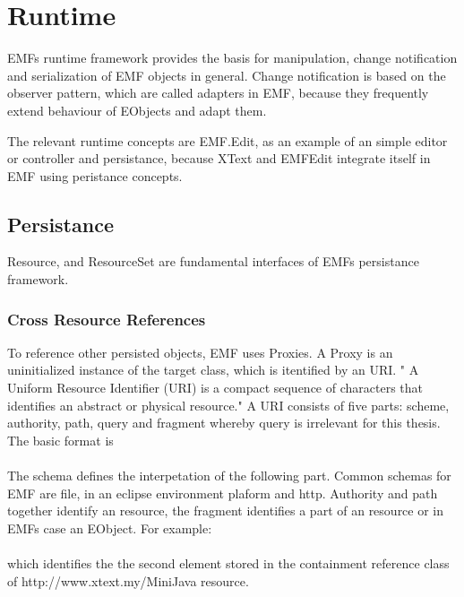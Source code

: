 \section{Runtime}
EMFs runtime framework provides the basis for manipulation, change notification and serialization of EMF objects in general. \cite{EMF2nd} Change notification is based on the observer pattern, which are called adapters in EMF, because they frequently extend behaviour of EObjects and adapt them.

The relevant runtime concepts are EMF.Edit, as an example of an simple editor or controller and  persistance, because XText \cite{XTextMan} and EMFEdit integrate itself in EMF using peristance concepts.

\subsection{Persistance}
Resource, and ResourceSet are fundamental interfaces of EMFs persistance framework.


\subsubsection{Cross Resource References}
To reference other persisted objects, EMF uses Proxies. A Proxy is an uninitialized instance of the target class, which is itentified by an URI. " A Uniform Resource Identifier (URI) is a compact sequence of characters that identifies an abstract or physical resource."\cite{URI} A URI consists of five parts: scheme, authority, path, query and fragment whereby query is irrelevant for this thesis. The basic format is\\
 \\
The schema defines the interpetation of the following part. Common schemas for EMF are file, in an eclipse environment plaform and http. Authority and path together identify an resource, the fragment identifies a part of an resource or in EMFs case an EObject.
For example:\\
\\
which identifies the the second element stored in the containment reference class of http://www.xtext.my/MiniJava resource.


